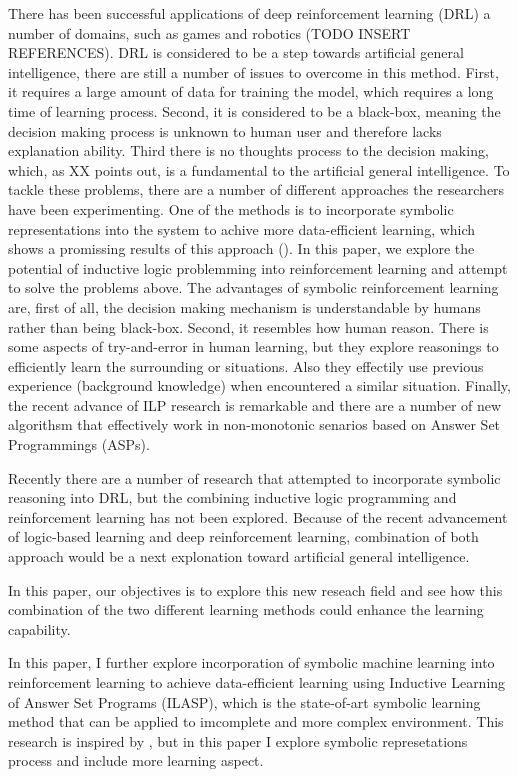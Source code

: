 \documentclass[12pt,twoside]{report}
\begin{document}
There has been successful applications of deep reinforcement learning (DRL) a number of domains, such as games and robotics (TODO INSERT REFERENCES).
DRL is considered to be a step towards artificial general intelligence, there are still a number of issues to overcome in this method.
First, it requires a large amount of data for training the model, which requires a long time of learning process.
Second, it is considered to be a black-box, meaning the decision making process is unknown to human user and therefore lacks explanation ability.
Third there is no thoughts process to the decision making, which, as XX points out, is a fundamental to the artificial general intelligence.
To tackle these problems, there are a number of different approaches the researchers have been experimenting.
One of the methods is to incorporate symbolic representations into the system to achive more data-efficient learning, which shows a promissing results of this approach (\cite{Garnelo2016}).
In this paper, we explore the potential of inductive logic problemming into reinforcement learning and attempt to solve the problems above.
The advantages of symbolic reinforcement learning are, first of all, the decision making mechanism is understandable by humans rather than being black-box.
Second, it resembles how human reason. There is some aspects of try-and-error in human learning, but they explore reasonings to efficiently learn the surrounding or situations.
Also they effectily use previous experience (background knowledge) when encountered a similar situation.
Finally, the recent advance of ILP research is remarkable and there are a number of new algorithsm that effectively work in non-monotonic senarios based on Answer Set Programmings (ASPs).

Recently there are a number of research that attempted to incorporate symbolic reasoning into DRL, but the combining inductive logic programming and reinforcement learning has not been explored.
Because of the recent advancement of logic-based learning and deep reinforcement learning, combination of both approach would be a next explonation toward artificial general intelligence.

In this paper, our objectives is to explore this new reseach field and see how this combination of the two different learning methods could enhance the learning capability.

In this paper, I further explore incorporation of symbolic machine learning into reinforcement learning to achieve data-efficient learning using Inductive Learning of Answer Set Programs (ILASP), which is the state-of-art symbolic learning method that can be applied to imcomplete and more complex environment.
This research is inspired by \cite{Garnelo2016}, but in this paper I explore symbolic represetations process and include more learning aspect.
\end{document}

